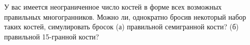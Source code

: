 \documentclass{article}
\begin{document}
У вас имеется неограниченное число костей в форме всех возможных правильных многогранников. Можно ли, однократно бросив некоторый набор
таких костей, симулировать бросок (а) правильной семигранной кости? (б) правильной 15-гранной кости?
\end{document}
